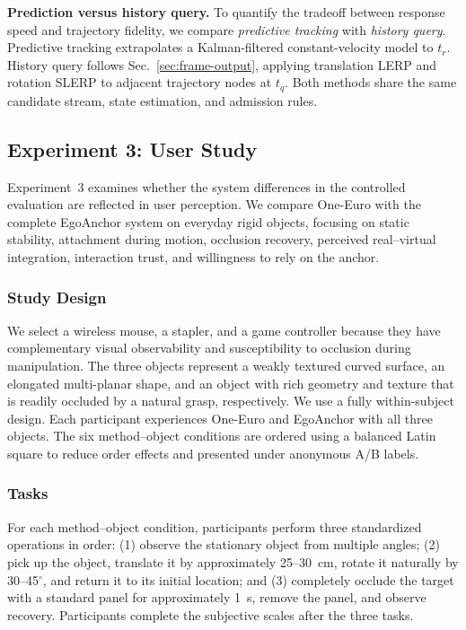 \documentclass[review]{vgtc}
\begin{document}
\textbf{Prediction versus history query.}
To quantify the tradeoff between response speed and trajectory fidelity, we compare \emph{predictive tracking} with \emph{history query}. Predictive tracking extrapolates a Kalman-filtered constant-velocity model to $t_r$. History query follows Sec.~\ref{sec:frame-output}, applying translation LERP and rotation SLERP to adjacent trajectory nodes at $t_q$. Both methods share the same candidate stream, state estimation, and admission rules.

\subsection{Experiment 3: User Study}\label{sec:exp3-design}

Experiment~3 examines whether the system differences in the controlled evaluation are reflected in user perception. We compare One-Euro with the complete EgoAnchor system on everyday rigid objects, focusing on static stability, attachment during motion, occlusion recovery, perceived real--virtual integration, interaction trust, and willingness to rely on the anchor.

\subsubsection{Study Design}

We select a wireless mouse, a stapler, and a game controller because they have complementary visual observability and susceptibility to occlusion during manipulation. The three objects represent a weakly textured curved surface, an elongated multi-planar shape, and an object with rich geometry and texture that is readily occluded by a natural grasp, respectively. We use a fully within-subject design. Each participant experiences One-Euro and EgoAnchor with all three objects. The six method--object conditions are ordered using a balanced Latin square to reduce order effects and presented under anonymous A/B labels.

\subsubsection{Tasks}

For each method--object condition, participants perform three standardized operations in order: (1) observe the stationary object from multiple angles; (2) pick up the object, translate it by approximately 25--30~cm, rotate it naturally by 30--45$^\circ$, and return it to its initial location; and (3) completely occlude the target with a standard panel for approximately 1~s, remove the panel, and observe recovery. Participants complete the subjective scales after the three tasks.
\end{document}
